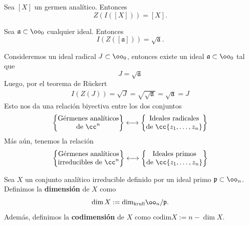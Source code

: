 \begin{propo}
	Sea $[X]$ un germen analítico. Entonces
	\begin{equation*}
		Z(I([X]))=[X].
	\end{equation*}
\end{propo}

\begin{theorem}[de Rückert]
	Sea $\mathfrak{a}\subset\oo_0$ cualquier ideal. Entonces
	\begin{equation*}
		I(Z([\mathfrak{a}]))=\sqrt{\mathfrak{a}}.
	\end{equation*}
\end{theorem}

\begin{remark}
	Consideremos un ideal radical $J\subset\oo_0$, entonces existe un ideal $\mathfrak{a}\subset\oo_0$ tal que
	\begin{equation*}
		J=\sqrt{\mathfrak{a}}
	\end{equation*}
	Luego, por el teorema de Rückert
	\begin{align*}
		I(Z(J))=\sqrt{J}=\sqrt{\sqrt{\mathfrak{a}}}=\sqrt{\mathfrak{a}}=J
	\end{align*}
	Esto nos da una relación biyectiva entre los dos conjuntos
	\begin{align*}
		\begin{Bmatrix}
			\text{Gérmenes analíticos}\\
			\text{de }\cc^n
		\end{Bmatrix}\longleftrightarrow\begin{Bmatrix}
			\text{Ideales radicales}\\
			\text{de }\cc\{z_1,\dots,z_n\}
		\end{Bmatrix}
	\end{align*}
	Más aún, tenemos la relación
	\begin{align*}
		\begin{Bmatrix}
			\text{Gérmenes analíticos}\\
			\text{irreducibles de }\cc^n
		\end{Bmatrix}\longleftrightarrow\begin{Bmatrix}
			\text{Ideales primos}\\
			\text{de }\cc\{z_1,\dots,z_n\}
		\end{Bmatrix}
	\end{align*}
\end{remark}

\begin{definition}
	Sea $X$ un conjunto analítico irreducible definido por un ideal primo $\mathfrak{p}\subset\oo_n$. Definimos la \textbf{dimensión} de $X$ como
	\begin{equation*}
		\dim X:=\mathrm{dim}_{\text{krull}}\oo_n/\mathfrak{p}.
	\end{equation*}
	Además, definimos la \textbf{codimensión} de $X$ como $\mathrm{codim}X:=n-\dim X$.
\end{definition}

